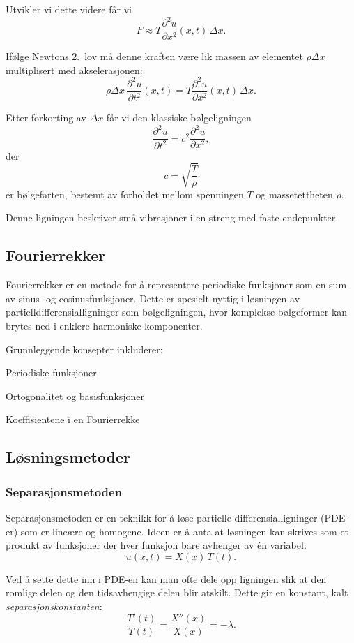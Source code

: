         Utvikler vi dette videre får vi
        \[
        F \approx T \frac{\partial^2 u}{\partial x^2}(x,t)\,\Delta x.
        \]

        Ifølge Newtons 2.\ lov må denne kraften være lik massen av elementet
        $\rho \Delta x$ multiplisert med akselerasjonen:
        \[
        \rho \Delta x \, \frac{\partial^2 u}{\partial t^2}(x,t)
        = T \frac{\partial^2 u}{\partial x^2}(x,t)\,\Delta x.
        \]

        Etter forkorting av $\Delta x$ får vi den klassiske bølgeligningen
        \[
        \frac{\partial^2 u}{\partial t^2} = c^2 \frac{\partial^2 u}{\partial x^2},
        \]
        der
        \[
        c = \sqrt{\frac{T}{\rho}}
        \]
        er bølgefarten, bestemt av forholdet mellom spenningen $T$ og massetettheten $\rho$.

        Denne ligningen beskriver små vibrasjoner i en streng med faste endepunkter.

\subsection{Fourierrekker}
    Fourierrekker er en metode for å representere periodiske funksjoner som en sum av sinus- og cosinusfunksjoner. Dette er spesielt nyttig i løsningen av partielldifferensialligninger som bølgeligningen, hvor komplekse bølgeformer kan brytes ned i enklere harmoniske komponenter.    
    
    Grunnleggende konsepter inkluderer:

    Periodiske funksjoner

    Ortogonalitet og basisfunksjoner

    Koeffisientene i en Fourierrekke
\subsection{Løsningsmetoder}

\subsubsection{Separasjonsmetoden}

    Separasjonsmetoden er en teknikk for å løse partielle differensialligninger (PDE-er) som er lineære og homogene. Ideen er å anta at løsningen kan skrives som et produkt av funksjoner der hver funksjon bare avhenger av én variabel:
    \[
    u(x,t) = X(x)\,T(t).
    \]

    Ved å sette dette inn i PDE-en kan man ofte dele opp ligningen slik at den romlige delen og den tidsavhengige delen blir atskilt. Dette gir en konstant, kalt \emph{separasjonskonstanten}:
    \[
    \frac{T'(t)}{T(t)} = \frac{X''(x)}{X(x)} = -\lambda.
    \]

